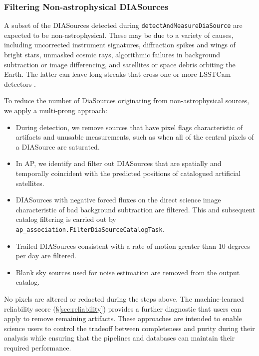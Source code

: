\subsubsection{Filtering Non-astrophysical DIASources}
\label{sec:streaks}

A subset of the DIASources detected during \texttt{detectAndMeasureDiaSource} are expected to be non-astrophysical.
These may be due to a variety of causes, including uncorrected instrument signatures, diffraction spikes and wings of bright stars, unmasked cosmic rays, algorithmic failures in background subtraction or image differencing, and satellites or space debris orbiting the Earth.
The latter can leave long streaks that cross one or more LSSTCam detectors
\citep{2020AJ....160..226T,2022A&C....3900584H}.

To reduce the number of DiaSources originating from non-astrophysical sources, we apply a multi-prong approach:

\begin{itemize}
\item During detection, we remove sources that have pixel flags characteristic of artifacts and unusable measurements, such as when all of the central pixels of a DIASource are saturated.

\item In AP, we identify and filter out DIASources that are spatially and temporally coincident with the predicted positions of catalogued artificial satellites.

\item DIASources with negative forced fluxes on the direct science image characteristic of bad background subtraction are filtered.  This and subsequent catalog filtering is carried out by \texttt{ap\_association.FilterDiaSourceCatalogTask}.

\item Trailed DIASources consistent with a rate of motion greater than 10 degrees per day are filtered.

\item Blank sky sources used for noise estimation are removed from the output catalog.

\end{itemize}

No pixels are altered or redacted during the steps above.
The machine-learned reliability score (\S\ref{sec:reliability}) provides a further diagnostic that users can apply to remove remaining artifacts.
These approaches are intended to enable science users to control the tradeoff between completeness and purity during their analysis while ensuring that the pipelines and databases can maintain their required performance.


